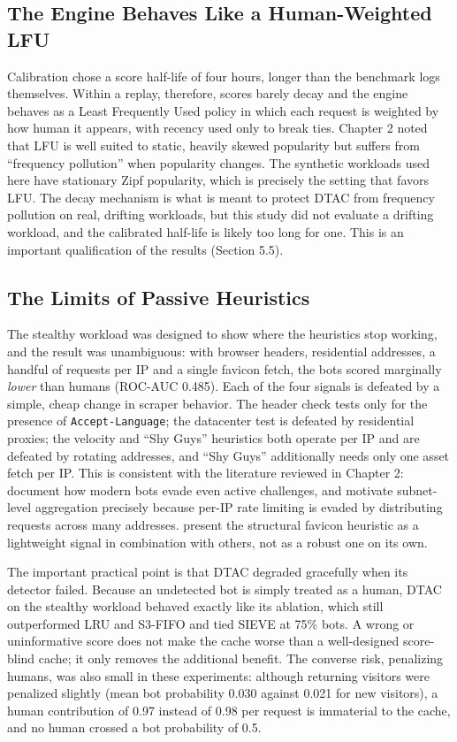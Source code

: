 \subsection{The Engine Behaves Like a Human-Weighted LFU}
Calibration chose a score half-life of four hours, longer than the benchmark logs themselves. Within a replay, therefore, scores barely decay and the engine behaves as a Least Frequently Used policy in which each request is weighted by how human it appears, with recency used only to break ties. Chapter 2 noted that LFU is well suited to static, heavily skewed popularity but suffers from ``frequency pollution'' when popularity changes. The synthetic workloads used here have stationary Zipf popularity, which is precisely the setting that favors LFU. The decay mechanism is what is meant to protect DTAC from frequency pollution on real, drifting workloads, but this study did not evaluate a drifting workload, and the calibrated half-life is likely too long for one. This is an important qualification of the results (Section 5.5).

\subsection{The Limits of Passive Heuristics}
The stealthy workload was designed to show where the heuristics stop working, and the result was unambiguous: with browser headers, residential addresses, a handful of requests per IP and a single favicon fetch, the bots scored marginally \emph{lower} than humans (ROC-AUC 0.485). Each of the four signals is defeated by a simple, cheap change in scraper behavior. The header check tests only for the presence of \texttt{Accept-Language}; the datacenter test is defeated by residential proxies; the velocity and ``Shy Guys'' heuristics both operate per IP and are defeated by rotating addresses, and ``Shy Guys'' additionally needs only one asset fetch per IP. This is consistent with the literature reviewed in Chapter 2:  document how modern bots evade even active challenges, and  motivate subnet-level aggregation precisely because per-IP rate limiting is evaded by distributing requests across many addresses.  present the structural favicon heuristic as a lightweight signal in combination with others, not as a robust one on its own.

The important practical point is that DTAC degraded gracefully when its detector failed. Because an undetected bot is simply treated as a human, DTAC on the stealthy workload behaved exactly like its ablation, which still outperformed LRU and S3-FIFO and tied SIEVE at 75\% bots. A wrong or uninformative score does not make the cache worse than a well-designed score-blind cache; it only removes the additional benefit. The converse risk, penalizing humans, was also small in these experiments: although returning visitors were penalized slightly (mean bot probability 0.030 against 0.021 for new visitors), a human contribution of 0.97 instead of 0.98 per request is immaterial to the cache, and no human crossed a bot probability of 0.5.

